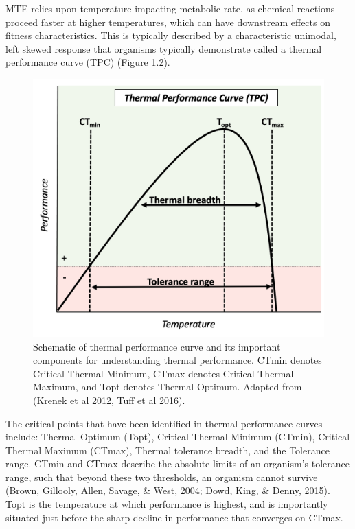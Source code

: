 \documentclass[12pt,twoside]{reedthesis}
\begin{document}
MTE relies upon temperature impacting metabolic rate, as chemical reactions proceed faster at higher temperatures, which can have downstream effects on fitness characteristics. This is typically described by a characteristic unimodal, left skewed response that organisms typically demonstrate called a thermal performance curve (TPC) (Figure 1.2).
\begin{figure}

{\centering \includegraphics[width=0.9\linewidth]{figures/figure2} 

}

\caption[Thermal performance curve components]{Schematic of thermal performance curve and its important components for understanding thermal performance. CTmin denotes Critical Thermal Minimum, CTmax denotes Critical Thermal Maximum, and Topt denotes Thermal Optimum. Adapted from (Krenek et al 2012, Tuff et al 2016).}\label{fig:unnamed-chunk-4}
\end{figure}
The critical points that have been identified in thermal performance curves include: Thermal Optimum (Topt), Critical Thermal Minimum (CTmin), Critical Thermal Maximum (CTmax), Thermal tolerance breadth, and the Tolerance range. CTmin and CTmax describe the absolute limits of an organism's tolerance range, such that beyond these two thresholds, an organism cannot survive (Brown, Gillooly, Allen, Savage, \& West, 2004; Dowd, King, \& Denny, 2015). Topt is the temperature at which performance is highest, and is importantly situated just before the sharp decline in performance that converges on CTmax.
\end{document}
